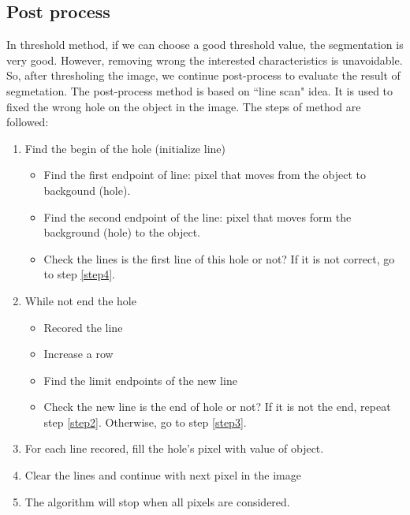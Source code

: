 \subsection{Post process}\label{postprocess}
In threshold method, if we can choose a good threshold value, the segmentation is very good. However, removing  wrong the interested characteristics is unavoidable. So, after thresholing the image, we continue post-process to evaluate the result of segmetation. The post-process method is based on ``line scan" idea. It is used to fixed the wrong hole on the object in the image. The steps of method are followed:
\begin{enumerate}
	\item Find the begin of the hole (initialize line)
		\begin{itemize}
			\item Find the first endpoint of line: pixel that moves from the object to backgound (hole).
			\item Find the second endpoint of the line: pixel that moves form the background (hole) to the object.
			\item Check the lines is the first line of this hole or not? If it is not correct, go to step \ref{step4}.
		\end{itemize}
	\item \label{step2}While not end the hole
		\begin{itemize}
			\item Recored the line
			\item Increase a row
			\item Find the limit endpoints of the new line
			\item Check the new line is the end of hole or not? If it is not the end, repeat step \ref{step2}. Otherwise, go to step \ref{step3}.
		\end{itemize}
	\item \label{step3}For each line recored, fill the hole's pixel with value of object.
	\item \label{step4}Clear the lines and continue with next pixel in the image
	\item The algorithm will stop when all pixels are considered.
\end{enumerate}
